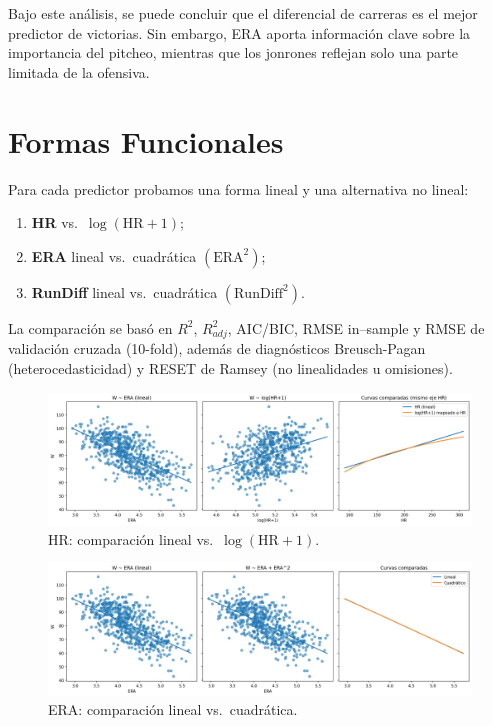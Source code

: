 \documentclass[10pt]{article}
\begin{document}
\noindent Bajo este análisis, se puede concluir que el diferencial de carreras es el mejor predictor de victorias. Sin embargo, ERA aporta información clave sobre la importancia del pitcheo, mientras que los jonrones reflejan solo una parte limitada de la ofensiva.
\section{Formas Funcionales}
Para cada predictor probamos una forma lineal y una alternativa no lineal:

\begin{enumerate}
    \item \textbf{HR} vs.\ \(\log(\text{HR}+1)\); 
    \item \textbf{ERA} lineal vs.\ cuadrática \((\text{ERA}^2)\); 
    \item \textbf{RunDiff} lineal vs.\ cuadrática \((\text{RunDiff}^2)\).
\end{enumerate}
La comparación se basó en \(R^2\), \(R^2_{adj}\), AIC/BIC, RMSE in--sample y RMSE de validación cruzada (10-fold), además de diagnósticos Breusch-Pagan (heterocedasticidad) y RESET de Ramsey (no linealidades u omisiones).



\begin{figure}[H]\centering
    \includegraphics[width=\textwidth]{../plots/formas_funcionales_HR.png}
    \caption{HR: comparación lineal vs.\ \(\log(\text{HR}+1)\).}
    \label{fig:ff_hr}
\end{figure}

\begin{figure}[H]\centering
    \includegraphics[width=\textwidth]{../plots/formas_funcionales_ERA.png}
    \caption{ERA: comparación lineal vs.\ cuadrática.}
    \label{fig:ff_era}
\end{figure}
    
\end{document}
